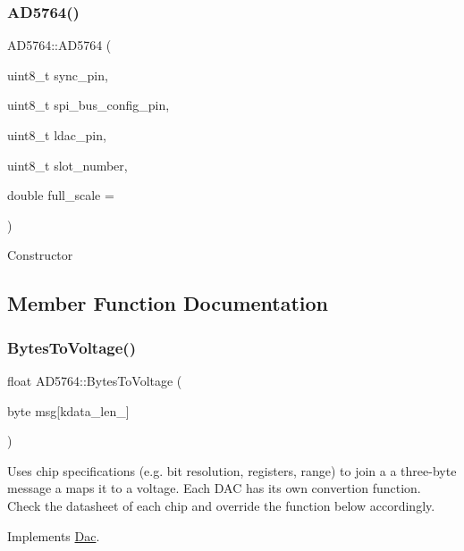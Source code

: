 \subsubsection{\texorpdfstring{A\+D5764()}{AD5764()}}
{\footnotesize\ttfamily A\+D5764\+::\+A\+D5764 (\begin{DoxyParamCaption}\item[{uint8\+\_\+t}]{sync\+\_\+pin,  }\item[{uint8\+\_\+t}]{spi\+\_\+bus\+\_\+config\+\_\+pin,  }\item[{uint8\+\_\+t}]{ldac\+\_\+pin,  }\item[{uint8\+\_\+t}]{slot\+\_\+number,  }\item[{double}]{full\+\_\+scale = {} }\end{DoxyParamCaption})}

Constructor 

\subsection{Member Function Documentation}
\mbox{\label{classAD5764_a8f2845c7dd6b8984e7b85c35e50bbb66}} 
\subsubsection{\texorpdfstring{Bytes\+To\+Voltage()}{BytesToVoltage()}}
{\footnotesize\ttfamily float A\+D5764\+::\+Bytes\+To\+Voltage (\begin{DoxyParamCaption}\item[{byte}]{msg\mbox{[}kdata\+\_\+len\+\_\+\mbox{]} }\end{DoxyParamCaption})\hspace{0.3cm}{\ttfamily [virtual]}}

Uses chip specifications (e.\+g. bit resolution, registers, range) to join a a three-\/byte message a maps it to a voltage. Each D\+AC has its own convertion function. Check the datasheet of each chip and override the function below accordingly. 

Implements \mbox{\hyperlink{classDac_a1dc9be97cb41ddacbd8dde0c5d4243b4}{Dac}}.

\mbox{\label{classAD5764_a85fac1341f18b4a7014da415b421cd03}} 
